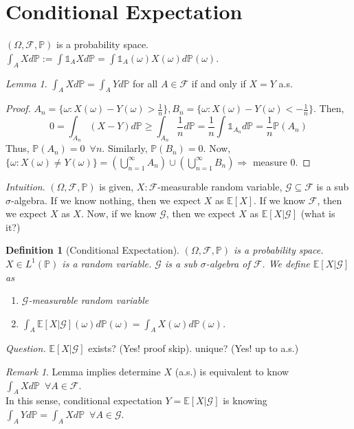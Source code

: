 \documentclass[12pt]{report}
\renewcommand{\P}{\mathbb{P}}
\newcommand{\F}{\mathcal{F}}
\newcommand{\E}{\mathbb{E}}
\renewcommand{\1}{\mathbb{1}}
\renewcommand{\O}{\Omega}
\renewcommand{\subset}{\subseteq}
\theoremstyle{break}
\theoremstyle{newdef}
\newtheorem{defn}[thm]{Definition} %
\theoremstyle{remark}
\newtheorem*{lem}{Lemma}
\newtheorem*{rem}{Remark} %
\begin{document}
\section{Conditional Expectation}
$(\O,\F,\P)$ is a probability space. $\int_A X d\P := \int \mathbb{1}_A X d\P = \int \mathbb{1}_A (\omega) X(\omega) d\P(\omega)$.
\begin{lem}
$\int_A Xd\P = \int_A Y d\P$ for all $A \in \F$ if and only if $X = Y$ a.s.
\begin{proof}
$A_n = \{ \omega : X(\omega) - Y(\omega) > \frac{1}{n}\},
B_n = \{ \omega : X(\omega) - Y(\omega) < -\frac{1}{n}\}$.
Then,
$$0 = \int_{A_n}(X-Y)d\P \geq \int_{A_n}\frac{1}{n}d\P = \frac{1}{n} \int \1_{A_n} d\P
= \frac{1}{n} \P(A_n)$$
Thus, $\P(A_n) = 0 \enspace \forall n$. Similarly, $\P(B_n) = 0$.
Now, $\{ \omega:X(\omega) \neq Y(\omega)\} = \left(\bigcup_{n=1}^\infty A_n\right) \cup \left(\bigcup_{n=1}^\infty B_n\right) \Rightarrow$ measure $0$.
\end{proof}
\end{lem}

\textit{Intuition}.
$(\O,\F,\P)$ is given, $X : \F$-measurable random variable, $\mathcal{G} \subset \F$ is a sub $\sigma$-algebra.
If we know nothing, then we expect $X$ as $\E[X]$.
If we know $\F$, then we expect $X$ as $X$.
Now, if we know $\mathcal{G}$, then we expect $X$ as $\E[X | \mathcal{G}]$ (what is it?)



\begin{defn}[Conditional Expectation]
$(\O,\F,\P)$ is a probability space.
$X \in L^1(\P)$ is a random variable.
$\mathcal{G}$ is a sub $\sigma$-algebra of $\F$.
We define $\E[X | \mathcal{G}]$ as
\begin{enumerate}
\item $\mathcal{G}$-measurable random variable
\item $\int_A \E[X|\mathcal{G}](\omega) d\P(\omega) = \int_A X(\omega) d\P(\omega)$.
\end{enumerate}
\end{defn}

\textit{Question.} $\E[X|\mathcal{G}]$ exists? (Yes! proof skip).
unique? (Yes! up to a.s.)

\begin{rem}
Lemma implies determine $X$ (a.s.) is equivalent to know $\int_A Xd\P \enspace \forall A \in \F$.\\
In this sense, conditional expectation $Y = \E[X|\mathcal{G}]$ is knowing $\int_A Yd\P = \int_A X d\P \enspace \forall A \in \mathcal{G}$.
\end{rem}
\end{document}
